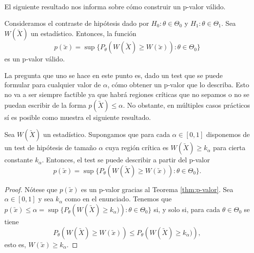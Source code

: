         El siguiente resultado nos informa sobre cómo construir un p-valor válido.

        \begin{thm} \label{thm:p-valor}
            Consideramos el contraste de hipótesis dado por $H_0: \theta \in \Theta_0$ y $H_1: \theta \in \Theta_1$. Sea $W(\utilde{X})$ un estadístico. Entonces, la función
            \[p(\utilde{x}) = \sup\{P_\theta(W(\utilde{X}) \ge W(\utilde{x})): \theta \in \Theta_0\}\]
            es un p-valor válido.
        \end{thm}

        La pregunta que uno se hace en este punto es, dado un test que se puede formular para cualquier valor de $\alpha$, cómo obtener un p-valor que lo describa. Esto no va a ser siempre factible ya que habrá regiones críticas que no sepamos o no se puedan escribir de la forma $p(\utilde{X}) \le \alpha$. No obstante, en múltiples casos prácticos sí es posible como muestra el siguiente resultado. %

        \begin{thm} \label{thm:p-valor:2}
            Sea $W(\utilde{X})$ un estadístico. Supongamos que para cada $\alpha \in [0,1]$ disponemos de un test de hipótesis de tamaño $\alpha$ cuya región crítica es $W(\utilde{X}) \ge k_\alpha$ para cierta constante $k_\alpha$. Entonces, el test se puede describir a partir del p-valor
           \[p(\utilde{x}) = \sup\{P_{\theta}\left(W(\utilde{X}) \ge W(\utilde{x})\right): \theta \in \Theta_0\}.\]
       \end{thm}
        \begin{proof}
            Nótese que $p(\utilde{x})$ es un p-valor gracias al Teorema \ref{thm:p-valor}. Sea $\alpha \in [0,1]$ y sea $k_\alpha$ como en el enunciado. Tenemos que $p(\utilde{x}) \le \alpha = \sup\{P_{\theta}\left(W(\utilde{X}) \ge k_\alpha)\right): \theta \in \Theta_0\}$ si, y solo si, para cada $\theta \in \Theta_0$ se tiene
            \[P_{\theta}\left(W(\utilde{X}) \ge W(\utilde{x})\right) \le P_{\theta}\left(W(\utilde{X}) \ge k_\alpha)\right) ,\]
            esto es, $W(\utilde{x}) \ge k_\alpha$.
        \end{proof}

